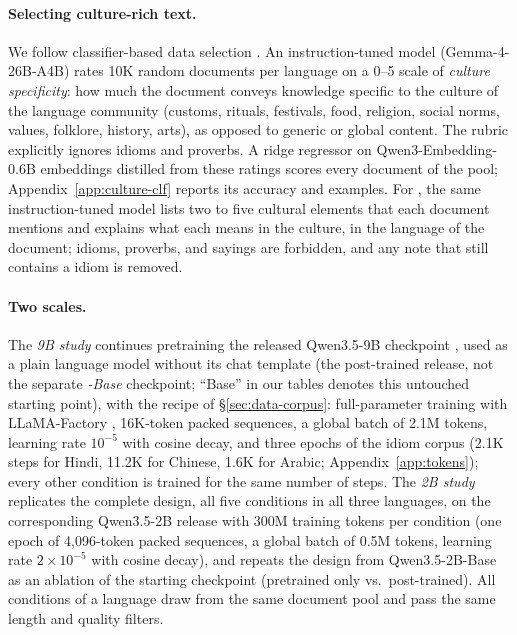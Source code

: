 \paragraph{Selecting culture-rich text.}
We follow classifier-based data selection \citep{penedo2024fineweb}. An instruction-tuned model (Gemma-4-26B-A4B) rates 10K random documents per language on a 0--5 scale of \textit{culture specificity}: how much the document conveys knowledge specific to the culture of the language community (customs, rituals, festivals, food, religion, social norms, values, folklore, history, arts), as opposed to generic or global content. The rubric explicitly ignores idioms and proverbs. A ridge regressor on Qwen3-Embedding-0.6B embeddings \citep{zhang2025qwen3embedding} distilled from these ratings scores every document of the pool; Appendix~\ref{app:culture-clf} reports its accuracy and examples. For \culturenotes{}, the same instruction-tuned model lists two to five cultural elements that each document mentions and explains what each means in the culture, in the language of the document; idioms, proverbs, and sayings are forbidden, and any note that still contains a \dataname{} idiom is removed.

\paragraph{Two scales.}
The \textit{9B study} continues pretraining the released Qwen3.5-9B checkpoint \citep{qwen2026qwen35,yang2025qwen3}, used as a plain language model without its chat template (the post-trained release, not the separate \textit{-Base} checkpoint; ``Base'' in our tables denotes this untouched starting point), with the recipe of \S\ref{sec:data-corpus}: full-parameter training with LLaMA-Factory \citep{zheng2024llamafactory}, 16K-token packed sequences, a global batch of 2.1M tokens, learning rate $10^{-5}$ with cosine decay, and three epochs of the idiom corpus (2.1K steps for Hindi, 11.2K for Chinese, 1.6K for Arabic; Appendix~\ref{app:tokens}); every other condition is trained for the same number of steps.
The \textit{2B study} replicates the complete design, all five conditions in all three languages, on the corresponding Qwen3.5-2B release with 300M training tokens per condition (one epoch of 4,096-token packed sequences, a global batch of 0.5M tokens, learning rate $2\times10^{-5}$ with cosine decay), and repeats the design from Qwen3.5-2B-Base as an ablation of the starting checkpoint (pretrained only vs.\ post-trained). All conditions of a language draw from the same document pool and pass the same length and quality filters.

